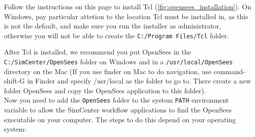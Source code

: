 Follow the instructions on this page to install Tcl
(\autoref{fig:opensees_installation}). On Windows, pay particular
attetion to the location Tcl must be installed in, as this is not the
default, and make sure you run the installer as administrator,
otherwise you will not be able to create the \texttt{C:/Program
Files/Tcl} folder.

After Tcl is installed, we recommend you put OpenSees in
the \texttt{C:/SimCenter/OpenSees} folder on Windows and in
a \texttt{/usr/local/OpenSees} directory on the Mac (If you use finder
on Mac to do navigation, use command-shift-G in Finder and specify
/usr/local as the folder to go to. There create a new folder OpenSees
and copy the OpenSees application to this folder).\\


Now you need to add the \texttt{OpenSees} folder to the
system \texttt{PATH} environment variable to allow the SimCenter
workflow applications to find the OpenSees executable on your
computer. The steps to do this depend on your operating system:

